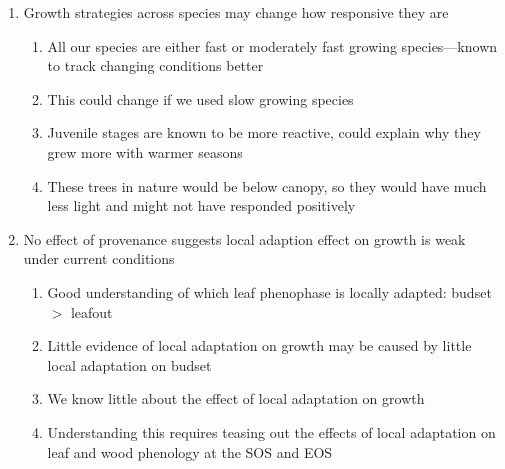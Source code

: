 \documentclass{article}\usepackage[]{graphicx}\usepackage[]{xcolor}
\begin{document}
\begin{enumerate}
\begin{enumerate}
\begin{enumerate}
    \item {\Ainc} grow more with GSL and earlier SOS: most growth happens in spring
    
    \item {\Ainc} is ruderal, takes advantage of cool and short days in spring
    
    \item Contrary, {\Bpap} and {\Bpop} driven by EOS: more reactive to warmer, late season temperature
    
    \item {\Ball} SOS and EOS trends counterinteract = no response to GSL
    
    \end{enumerate}
  
  \item Growth strategies across species may change how responsive they are
    \begin{enumerate}
    \item All our species are either fast or moderately fast growing species---known to track changing conditions better
    
    \item This could change if we used slow growing species
    
    \item Juvenile stages are known to be more reactive, could explain why they grew more with warmer seasons
    
    \item These trees in nature would be below canopy, so they would have much less light and might not have responded positively
    \end{enumerate}
  
  \item No effect of provenance suggests local adaption effect on growth is weak under current conditions
    \begin{enumerate}
    \item Good understanding of which leaf phenophase is locally adapted: budset $>$ leafout
    
    \item Little evidence of local adaptation on growth may be caused by little local adaptation on budset
    
    \item We know little about the effect of local adaptation on growth
    
    \item Understanding this requires teasing out the effects of local adaptation on leaf and wood phenology at the SOS and EOS
    \end{enumerate}
  \end{enumerate}


\end{enumerate}
\end{document}
